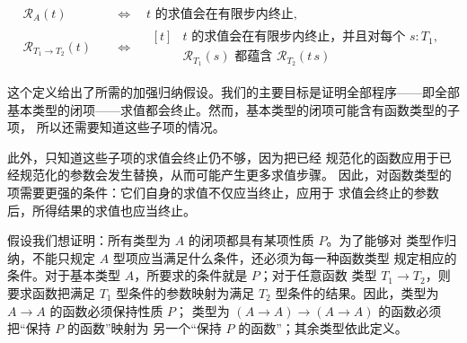 \begin{definition}
\label{def:12.1.2}
\[
\begin{aligned}
\mathcal R_A(t)
&\quad\Longleftrightarrow\quad t\text{ 的求值会在有限步内终止},\\
\mathcal R_{T_1\to T_2}(t)
&\quad\Longleftrightarrow\quad
\begin{aligned}[t]
&t\text{ 的求值会在有限步内终止，并且对每个 }s:T_1,\\
&\mathcal R_{T_1}(s)\text{ 都蕴含 }\mathcal R_{T_2}(t\,s)
\end{aligned}
\end{aligned}
\]
\end{definition}

这个定义给出了所需的加强归纳假设。我们的主要目标是证明全部程序——即全部
基本类型的闭项——求值都会终止。然而，基本类型的闭项可能含有函数类型的子项，
所以还需要知道这些子项的情况。


此外，只知道这些子项的求值会终止仍不够，因为把已经
规范化的函数应用于已经规范化的参数会发生替换，从而可能产生更多求值步骤。
因此，对函数类型的项需要更强的条件：它们自身的求值不仅应当终止，应用于
求值会终止的参数后，所得结果的求值也应当终止。

假设我们想证明：所有类型为 \(A\) 的闭项都具有某项性质 \(P\)。为了能够对
类型作归纳，不能只规定 \(A\) 型项应当满足什么条件，还必须为每一种函数类型
规定相应的条件。对于基本类型 \(A\)，所要求的条件就是 \(P\)；对于任意函数
类型 \(T_1\to T_2\)，则要求函数把满足 \(T_1\) 型条件的参数映射为满足
\(T_2\) 型条件的结果。因此，类型为 \(A\to A\) 的函数必须保持性质 \(P\)；
类型为 \((A\to A)\to(A\to A)\) 的函数必须把“保持 \(P\) 的函数”映射为
另一个“保持 \(P\) 的函数”；其余类型依此定义。

